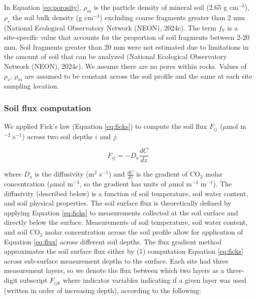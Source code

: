 \documentclass[
  letterpaper,
  DIV=11,
  numbers=noendperiod]{scrartcl}
\begin{document}
In Equation \ref{eq:porosity}, \(\rho_{m}\) is the particle density of
mineral soil (2.65 g cm\(^{-3}\)), \(\rho_{s}\) the soil bulk density (g
cm\(^{-3}\)) excluding coarse fragments greater than 2 mm (National
Ecological Observatory Network (NEON), 2024c). The term \(f_{V}\) is a
site-specific value that accounts for the proportion of soil fragments
between 2-20 mm. Soil fragments greater than 20 mm were not estimated
due to limitations in the amount of soil that can be analyzed (National
Ecological Observatory Network (NEON), 2024c). We assume there are no
pores within rocks. Values of \(\rho_{s}\), \(\rho_{m}\) are assumed to
be constant across the soil profile and the same at each site sampling
location.

\subsubsection{Soil flux computation}\label{sec-compute-soil-flux}

We applied Fick's law (Equation \ref{eq:ficks}) to compute the soil flux
\(F_{ij}\) (\(\mu\)mol m\(^{-2}\) s\(^{-1}\)) across two soil depths
\(i\) and \(j\):

\begin{equation}
  F_{ij} = -D_{a} \frac{dC}{dz}
  \label{eq:ficks}
\end{equation}

where \(D_{a}\) is the diffusivity (m\(^{2}\) s\(^{-1}\)) and
\(\frac{dC}{dz}\) is the gradient of CO\(_{2}\) molar concentration
(\(\mu\)mol m\(^{-3}\), so the gradient has units of \(\mu\)mol
m\(^{-3}\) m\(^{-1}\)). The diffusivity (described below) is a function
of soil temperature, soil water content, and soil physical properties.
The soil surface flux is theoretically defined by applying Equation
\ref{eq:ficks} to measurements collected at the soil surface and
directly below the surface. Measurements of soil temperature, soil water
content, and soil CO\(_{2}\) molar concentration across the soil profile
allow for application of Equation \ref{eq:flux} across different soil
depths. The flux gradient method approximates the soil surface flux
either by (1) computation Equation \ref{eq:ficks} across sub-surface
measurement depths to the surface. Each site had three measurement
layers, so we denote the flux between which two layers as a three-digit
subscript \(F_{ijk}\) where indicator variables indicating if a given
layer was used (written in order of increasing depth), according to the
following:
\end{document}
